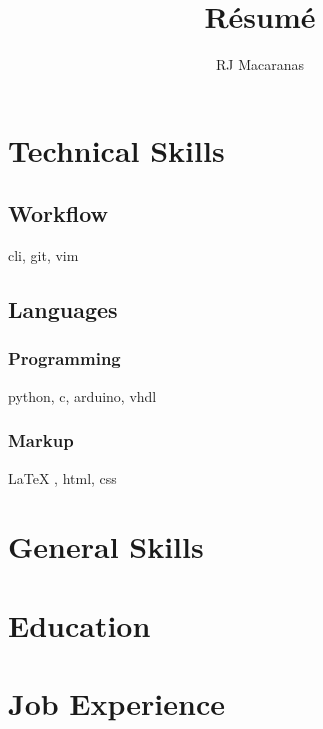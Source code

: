 \documentclass{article}
\begin{document}
\title{R\'esum\'e}
\author{RJ Macaranas}
\maketitle

\section{Technical Skills}

\subsection{Workflow}
cli, git, vim 

\subsection{Languages}
\subsubsection{Programming}
python, c, arduino, vhdl

\subsubsection{Markup}
{\LaTeX} , html, css

\section{General Skills}

\section{Education}

\section{Job Experience}
\end{document}
